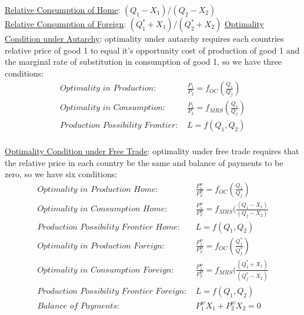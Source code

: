 \documentclass{article}
\begin{document}
\underline{Relative Consumption of Home}: $(Q_{1}-X_{1})/(Q_{2}-X_{2})$ \\
\underline{Relative Consumption of Foreign}: $(Q_{1}^{*}+X_{1})/(Q_{2}^{*}+X_{2})$
\underline{Optimality Condition under Autarchy}: optimality under autarchy requires each countries relative price of good 1 to equal it's opportunity cost of production of good 1 and the marginal rate of substitution in consumption of good 1, so we have three conditions:
\begin{align*}
  \textit{Optimality in Production: }& \tfrac{P_{1}}{P_{2}} = f_{OC}(\tfrac{Q_{1}}{Q_{f}}) \\
  \textit{Optimality in Consumption: }& \tfrac{P_{1}}{P_{2}} = f_{MRS}(\tfrac{Q_{1}}{Q_{f}}) \\
  \textit{Production Possibility Frontier: }& L = f(Q_{1}, Q_{2})
\end{align*} \\
\underline{Optimality Condition under Free Trade}: optimality under free trade requires that the relative price in each country be the same and balance of payments to be zero, so we have six conditions:
\begin{align*}
  \textit{Optimality in Production Home: }& \tfrac{P_{1}^{w}}{P_{2}^{w}} = f_{OC}(\tfrac{Q_{1}}{Q_{f}}) \\
  \textit{Optimality in Consumption Home: }& \tfrac{P_{1}^{w}}{P_{2}^{w}} = f_{MRS}(\tfrac{(Q_{1}-X_{1})}{(Q_{f}-X_{2})} \\
  \textit{Production Possibility Frontier Home: }& L = f(Q_{1}, Q_{2}) \\
  \textit{Optimality in Production Foreign: }& \tfrac{P_{1}^{w}}{P_{2}^{w}} = f_{OC}(\tfrac{Q_{1}^{*}}{Q_{f}^{*}}) \\
  \textit{Optimality in Consumption Foreign: }& \tfrac{P_{1}^{w}}{P_{2}^{w}} = f_{MRS}(\tfrac{(Q_{1}^{*}+X_{1})}{(Q_{f}^{*}-X_{2})} \\
  \textit{Production Possibility Frontier Foreign: }& L = f(Q_{1}, Q_{2}) \\
  \textit{Balance of Payments: }& P_{1}^{w}X_{1} + P_{2}^{w}X_{2} = 0
\end{align*}
\end{document}
